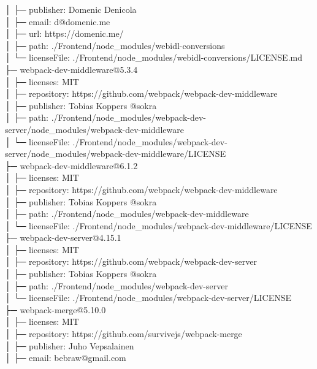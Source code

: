 \documentclass[
    paper=a4,
    twoside=false,
    parskip=half,
    listof=entryprefix,
    listof=totoc,
    index=totoc,
    bibliography=totoc,
    headsepline,
]{scrbook}
\begin{document}
    │  ├─ publisher: Domenic Denicola\\
    │  ├─ email: d@domenic.me\\
    │  ├─ url: https://domenic.me/\\
    │  ├─ path: ./Frontend/node\_modules/webidl-conversions\\
    │  └─ licenseFile: ./Frontend/node\_modules/webidl-conversions/LICENSE.md\\
    ├─ webpack-dev-middleware@5.3.4\\
    │  ├─ licenses: MIT\\
    │  ├─ repository: https://github.com/webpack/webpack-dev-middleware\\
    │  ├─ publisher: Tobias Koppers @sokra\\
    │  ├─ path: ./Frontend/node\_modules/webpack-dev-server/node\_modules/webpack-dev-middleware\\
    │  └─ licenseFile: ./Frontend/node\_modules/webpack-dev-server/node\_modules/webpack-dev-middleware/LICENSE\\
    ├─ webpack-dev-middleware@6.1.2\\
    │  ├─ licenses: MIT\\
    │  ├─ repository: https://github.com/webpack/webpack-dev-middleware\\
    │  ├─ publisher: Tobias Koppers @sokra\\
    │  ├─ path: ./Frontend/node\_modules/webpack-dev-middleware\\
    │  └─ licenseFile: ./Frontend/node\_modules/webpack-dev-middleware/LICENSE\\
    ├─ webpack-dev-server@4.15.1\\
    │  ├─ licenses: MIT\\
    │  ├─ repository: https://github.com/webpack/webpack-dev-server\\
    │  ├─ publisher: Tobias Koppers @sokra\\
    │  ├─ path: ./Frontend/node\_modules/webpack-dev-server\\
    │  └─ licenseFile: ./Frontend/node\_modules/webpack-dev-server/LICENSE\\
    ├─ webpack-merge@5.10.0\\
    │  ├─ licenses: MIT\\
    │  ├─ repository: https://github.com/survivejs/webpack-merge\\
    │  ├─ publisher: Juho Vepsalainen\\
    │  ├─ email: bebraw@gmail.com\\
\end{document}
